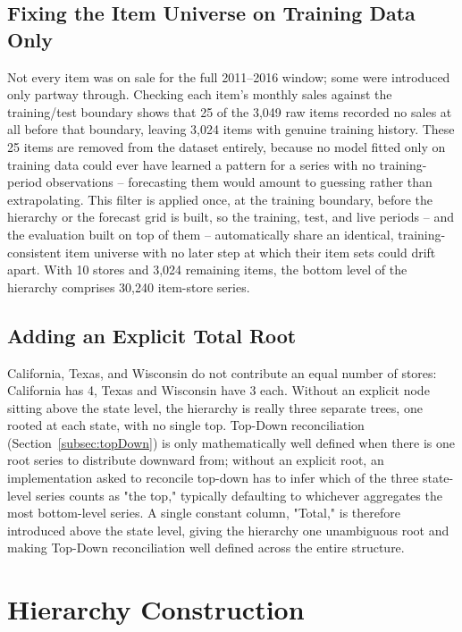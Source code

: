 \subsection{Fixing the Item Universe on Training Data Only}
\label{sec:itemUniverse}

Not every item was on sale for the full 2011--2016 window; some were introduced only partway through. Checking each item's monthly sales against the training/test boundary shows that 25 of the 3,049 raw items recorded no sales at all before that boundary, leaving 3,024 items with genuine training history. These 25 items are removed from the dataset entirely, because no model fitted only on training data could ever have learned a pattern for a series with no training-period observations -- forecasting them would amount to guessing rather than extrapolating. This filter is applied once, at the training boundary, before the hierarchy or the forecast grid is built, so the training, test, and live periods -- and the evaluation built on top of them -- automatically share an identical, training-consistent item universe with no later step at which their item sets could drift apart. With 10 stores and 3,024 remaining items, the bottom level of the hierarchy comprises 30,240 item-store series.

\subsection{Adding an Explicit Total Root}
\label{sec:totalRoot}

California, Texas, and Wisconsin do not contribute an equal number of stores: California has 4, Texas and Wisconsin have 3 each. Without an explicit node sitting above the state level, the hierarchy is really three separate trees, one rooted at each state, with no single top. Top-Down reconciliation (Section~\ref{subsec:topDown}) is only mathematically well defined when there is one root series to distribute downward from; without an explicit root, an implementation asked to reconcile top-down has to infer which of the three state-level series counts as "the top," typically defaulting to whichever aggregates the most bottom-level series. A single constant column, "Total," is therefore introduced above the state level, giving the hierarchy one unambiguous root and making Top-Down reconciliation well defined across the entire structure.

\section{Hierarchy Construction}
\label{sec:hierarchyConstruction}

